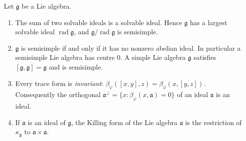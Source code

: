 \begin{lemma}\label{representation-theory:lemma-radical}
Let $\mathfrak{g}$ be a Lie algebra.
\begin{enumerate}
\item The sum of two solvable ideals is a solvable ideal. Hence $\mathfrak{g}$ has a largest solvable ideal $\operatorname{rad}\mathfrak{g}$, and
$\mathfrak{g}/\operatorname{rad}\mathfrak{g}$ is semisimple.
\item $\mathfrak{g}$ is semisimple if and only if it has no nonzero abelian ideal. In particular a semisimple Lie algebra has centre $0$. A simple Lie algebra $\mathfrak{g}$
satisfies $[\mathfrak{g}, \mathfrak{g}] = \mathfrak{g}$ and is semisimple.
\item Every trace form is \emph{invariant}: $\beta_\varphi([x, y], z) = \beta_\varphi(x, [y, z])$. Consequently the orthogonal
$\mathfrak{a}^\perp = \{x : \beta_\varphi(x, \mathfrak{a}) = 0\}$ of an ideal $\mathfrak{a}$ is an ideal.
\item If $\mathfrak{a}$ is an ideal of $\mathfrak{g}$, the Killing form of the Lie algebra $\mathfrak{a}$ is the restriction of $\kappa_{\mathfrak{g}}$ to
$\mathfrak{a} \times \mathfrak{a}$.
\end{enumerate}
\end{lemma}

